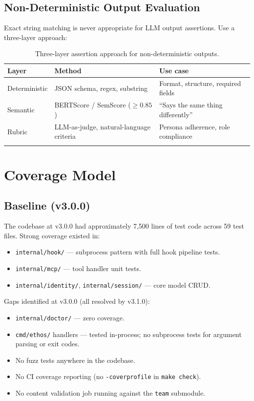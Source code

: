 \documentclass[a4paper,10pt]{article}
\newcommand{\pkg}[1]{\texttt{#1}}
\newcommand{\cmd}[1]{\texttt{#1}}
\begin{document}
\subsection{Non-Deterministic Output Evaluation}

Exact string matching is never appropriate for LLM output assertions.
Use a three-layer approach:

\begin{longtable}{lll}
\toprule
\textbf{Layer} & \textbf{Method} & \textbf{Use case} \\
\midrule
\endhead
Deterministic & JSON schema, regex, substring & Format, structure, required fields \\
Semantic      & BERTScore / SemScore ($\ge 0.85$) & ``Says the same thing differently'' \\
Rubric        & LLM-as-judge, natural-language criteria & Persona adherence, role compliance \\
\bottomrule
\caption{Three-layer assertion approach for non-deterministic outputs.}
\end{longtable}

\section{Coverage Model}

\subsection{Baseline (v3.0.0)}

The codebase at v3.0.0 had approximately 7,500 lines of test code
across 59 test files.  Strong coverage existed in:

\begin{itemize}
  \item \pkg{internal/hook/} --- subprocess pattern with full hook
    pipeline tests.
  \item \pkg{internal/mcp/} --- tool handler unit tests.
  \item \pkg{internal/identity/}, \pkg{internal/session/} --- core
    model CRUD.
\end{itemize}

Gaps identified at v3.0.0 (all resolved by v3.1.0):

\begin{itemize}
  \item \pkg{internal/doctor/} --- zero coverage.
  \item \pkg{cmd/ethos/} handlers --- tested in-process; no subprocess
    tests for argument parsing or exit codes.
  \item No fuzz tests anywhere in the codebase.
  \item No CI coverage reporting (no \texttt{-coverprofile} in
    \cmd{make check}).
  \item No content validation job running against the \texttt{team}
    submodule.
\end{itemize}
\end{document}
